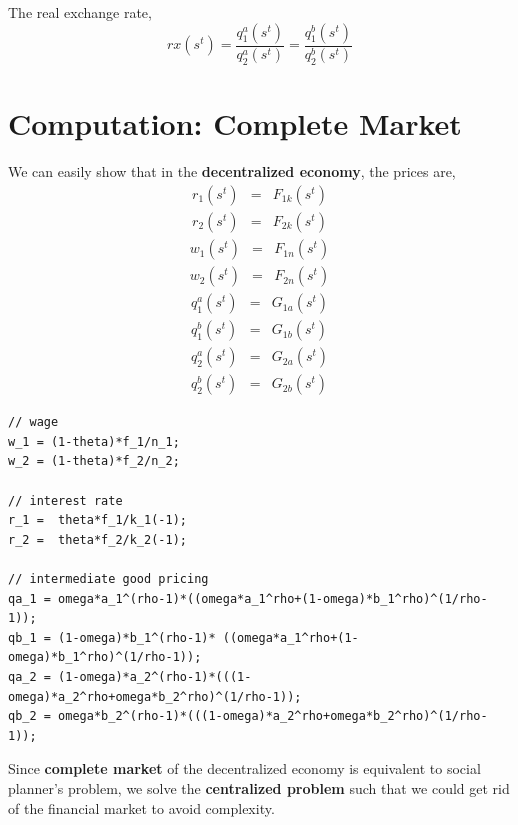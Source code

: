 \documentclass[11pt,a4paper]{article}
\begin{document}
The real exchange rate,
\begin{equation}
rx(s^t)=\frac{q_1^a(s^t)}{q_2^a(s^t)}=\frac{q_1^b(s^t)}{q_2^b(s^t)}
\end{equation}


\section{Computation: Complete Market}
We can easily show that in the \textbf{decentralized economy}, the prices are,
\begin{eqnarray}
r_1(s^t) &=& F_{1k}(s^t)\\
r_2 (s^t)&=& F_{2k}(s^t)
\end{eqnarray}
\begin{eqnarray}
w_1(s^t) &=& F_{1n}(s^t)\\
w_2(s^t) &=& F_{2n}(s^t)
\end{eqnarray}
\begin{eqnarray}
q_1^a(s^t) &=& G_{1a}(s^t)\\
q_1^b(s^t) &=& G_{1b}(s^t)\\
q_2^a(s^t) &=& G_{2a}(s^t)\\
q_2^b(s^t) &=& G_{2b}(s^t)
\end{eqnarray}
\begin{lstlisting}
// wage 
w_1 = (1-theta)*f_1/n_1;
w_2 = (1-theta)*f_2/n_2;

// interest rate 
r_1 =  theta*f_1/k_1(-1);
r_2 =  theta*f_2/k_2(-1);

// intermediate good pricing
qa_1 = omega*a_1^(rho-1)*((omega*a_1^rho+(1-omega)*b_1^rho)^(1/rho-1));
qb_1 = (1-omega)*b_1^(rho-1)* ((omega*a_1^rho+(1-omega)*b_1^rho)^(1/rho-1));
qa_2 = (1-omega)*a_2^(rho-1)*(((1-omega)*a_2^rho+omega*b_2^rho)^(1/rho-1));
qb_2 = omega*b_2^(rho-1)*(((1-omega)*a_2^rho+omega*b_2^rho)^(1/rho-1));
\end{lstlisting}

Since \textbf{complete market} of the decentralized economy is equivalent to social planner's problem, we  solve the \textbf{centralized problem} such that we could get rid of the financial market to avoid complexity. 
\end{document}
